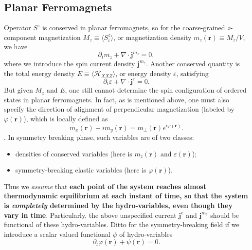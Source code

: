 \documentclass[10pt,nofootinbib]{revtex4}
\def\H{\mathcal{H}}
\begin{document}
	\subsection{Planar Ferromagnets}
		Operator $S^z$ is conserved in planar ferromagnets, so for the coarse-grained $z$-component magnetization $M_z\equiv\langle S_i^z\rangle$, or magnetization density $m_z(\bm{r})\equiv M_z/V$, we have
		\begin{equation}\label{1.1.2}
			\partial_t m_z+\nabla\cdot\bm{j}^{m_z}=0,
		\end{equation}
		where we introduce the spin current density $\bm{j}^{m_z}$. Another conserved quantity is the total energy density $E\equiv\langle \H_{XXZ}\rangle$, or energy density $\varepsilon$, satisfying
		\begin{equation}\label{1.1.3}
			\partial_t \varepsilon+\nabla\cdot\bm{j}^\varepsilon=0.
		\end{equation}
		\indent But given $M_z$ and $E$, one still cannot determine the spin configuration of ordered states in planar ferromagnets. In fact, as is mentioned above, one must also specify the direction of alignment of perpendicular magnetization (labeled by $\varphi(\bm{r})$), which is locally defined as
		\begin{equation*}
			m_x(\bm{r})+im_y(\bm{r})=m_\perp(\bm{r})e^{i\varphi(\bm{r})}.
		\end{equation*}
		. In symmetry breaking phase, such variables are of two classes:
		\begin{itemize}
			\item densities of conserved variables (here is $m_z(\bm{r})$ and $\varepsilon(\bm{r})$);
			\item symmetry-breaking elastic variables (here is $\varphi(\bm{r})$).
		\end{itemize}
		Thus we \emph{assume} that {\bf each point of the system reaches almost thermodynamic equilibrium at each instant of time, so that the system is \emph{completely} determined by the hydro-variables, even though they vary in time}. Particularly, the above unspecified current $\bm{j}^e$ and $\bm{j}^{m_z}$ should be functional of these hydro-variables. Ditto for the symmetry-breaking field if we introduce a scalar valued functional $\psi$ of hydro-variables
		\begin{equation}\label{1.1.4}
			\partial_t \varphi(\bm{r})+\psi(\bm{r})=0.
		\end{equation}
\end{document}
